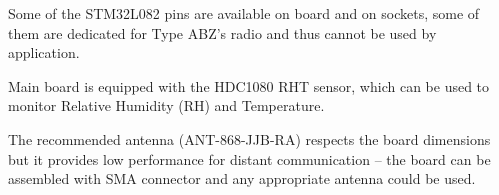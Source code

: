 \documentclass[twoside,a4paper]{refart}
\begin{document}
  Some of the STM32L082 pins are available on board and on sockets, some of them are dedicated for Type ABZ's radio and thus cannot be used by application.
  
  Main board is equipped with the HDC1080 RHT sensor, which can be used to monitor Relative Humidity (RH) and Temperature.
  
  The recommended antenna (ANT-868-JJB-RA) respects the board dimensions but it provides low performance for distant communication -- the board can be assembled with SMA connector and any appropriate antenna could be used.
  
  
  \newpage
  
\end{document}
